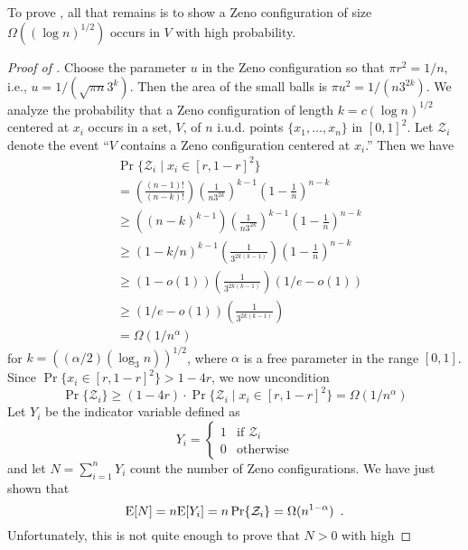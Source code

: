 \documentclass{patmorin}
\begin{document}
To prove , all that remains is to show a Zeno
configuration of size $\Omega((\log n)^{1/2})$ occurs in $V$ with high
probability.

\begin{proof}[Proof of ]
Choose the parameter $u$ in the Zeno configuration so that $\pi r^2=1/n$,
i.e., $u=1/(\sqrt{\pi n}3^k)$.  Then the area of the small balls is
$\pi u^2=1/(n3^{2k})$.
We analyze the probability that a Zeno configuration of length $k=c(\log
n)^{1/2}$ centered at $x_i$ occurs in a set, $V$, of $n$ i.u.d. points
$\{x_1,\ldots,x_n\}$ in
$[0,1]^2$.  Let $\mathcal{Z}_i$ denote the event ``$V$
contains a Zeno configuration centered at $x_i$.''  Then we have
\begin{align*}
 &\!\!\!\! \Pr\{\mathcal{Z}_i\mid x_i\in[r,1-r]^2\} \\
  & = \left(\frac{(n-1)!}{(n-k)!}\right) %
      \left(\frac{1}{n3^{2k}}\right)^{k-1}   %
      \left(1-\frac{1}{n}\right)^{n-k}   \\ %
  & \ge
      \left((n-k)^{k-1}\right) 
      \left(\frac{1}{n3^{2k}}\right)^{k-1}  
      \left(1-\frac{1}{n}\right)^{n-k}   \\ 
  & \ge 
      (1-k/n)^{k-1} %
      \left(\frac{1}{3^{2k(k-1)}}\right)
      \left(1-\frac{1}{n}\right)^{n-k} \\
  & \ge
      \left(1-o(1)\right) 
      \left(\frac{1}{3^{2k(k-1)}}\right)
      \left(1/e-o(1)\right)   \\ 
  & \ge (1/e-o(1)) \left(\frac{1}{3^{2k(k-1)}}\right) \\
  & = \Omega(1/n^{\alpha})
\end{align*}
for $k=((\alpha/2)(\log_3 n))^{1/2}$, where $\alpha$ is a free parameter
in the range $[0,1]$.  Since $\Pr\{x_i\in[r,1-r]^2\} > 1-4r$, we now
uncondition
\[
 \Pr\{\mathcal{Z}_i\} \ge  
    (1-4r)\cdot\Pr\{\mathcal{Z}_i\mid x_i\in[r,1-r]^2\}
    = \Omega(1/n^{\alpha})
\]
Let $Y_i$ be the indicator variable defined as
\[
   Y_i = \begin{cases} 1 & \text{if $\mathcal{Z}_i$} \\
                       0 & \text{otherwise} 
         \end{cases}
\]
and let $N=\sum_{i=1}^n Y_i$ count the number of Zeno configurations.  We
have just shown that 
\[
   \mathrm{E}[N] = n\mathrm{E}[Y_i] = n\Pr\{\mathcal{Z}_i\}=\Omega(n^{1-\alpha}) \enspace .
\]
Unfortunately, this is not quite enough to prove that $N>0$ with high

\end{proof}
\end{document}
